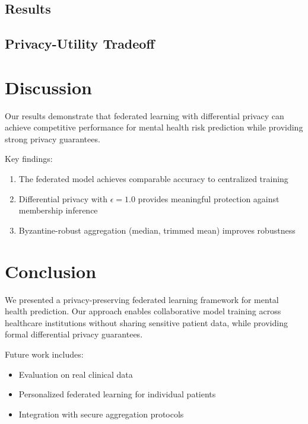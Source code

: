\documentclass[11pt,a4paper]{article}
\begin{document}
\subsection{Results}



\subsection{Privacy-Utility Tradeoff}


\section{Discussion}

Our results demonstrate that federated learning with differential privacy can achieve competitive performance for mental health risk prediction while providing strong privacy guarantees.

Key findings:
\begin{enumerate}
    \item The federated model achieves comparable accuracy to centralized training
    \item Differential privacy with $\epsilon = 1.0$ provides meaningful protection against membership inference
    \item Byzantine-robust aggregation (median, trimmed mean) improves robustness
\end{enumerate}

\section{Conclusion}

We presented a privacy-preserving federated learning framework for mental health prediction. Our approach enables collaborative model training across healthcare institutions without sharing sensitive patient data, while providing formal differential privacy guarantees.

Future work includes:
\begin{itemize}
    \item Evaluation on real clinical data
    \item Personalized federated learning for individual patients
    \item Integration with secure aggregation protocols
\end{itemize}
\end{document}
